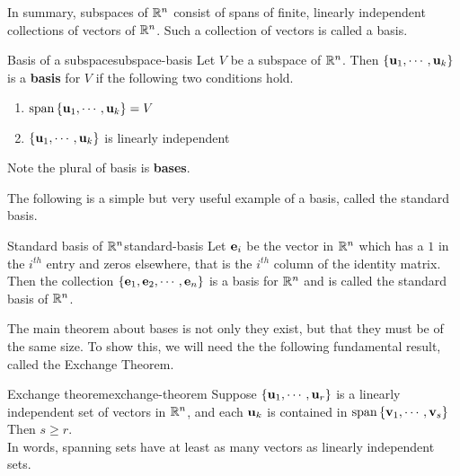 In summary, subspaces of $\mathbb{R}^{n}$ consist of spans of finite, linearly
independent collections of vectors of $\mathbb{R}^{n}$.  Such a collection of
vectors is called a basis.

\begin{definition}{Basis of a subspace}{subspace-basis}
  Let $V$ be a subspace of $\mathbb{R}^{n}$. Then
  $\left\{ \mbox{\bf u}_{1},\cdots ,\mbox{\bf u}_{k}\right\} $ is a \textbf{basis} for
  $V$ if the following two conditions
  hold.

  \begin{enumerate}
  \item $\sspan\set{\vect{u}_{1},\cdots ,\vect{u}_{k}} =V$
  \item $\left\{\mbox{\bf u}_{1},\cdots ,\mbox{\bf u}_{k}\right\} $ is linearly
    independent
  \end{enumerate}

  Note the plural of basis is \textbf{bases}. 
\end{definition}

The following is a simple but very useful example of a basis, called
the standard basis.

\begin{definition}{Standard basis of $\mathbb{R}^n$}{standard-basis}
  Let $\mbox{\bf e}_i$ be the vector in $\mathbb{R}^n$ which has a $1$ in the
  $i^{th}$ entry and zeros elsewhere, that is the $i^{th}$ column of
  the identity matrix. Then the collection
  $\left\{\mbox{\bf e}_1, \mbox{\bf e}_2, \cdots, \mbox{\bf e}_n \right\}$ is a basis for
  $\mathbb{R}^n$ and is called the standard basis of
  $\mathbb{R}^n$.
\end{definition}

The main theorem about bases is not only they exist, but that they
must be of the same size. To show this, we will need the the following
fundamental result, called the Exchange Theorem.

\begin{theorem}{Exchange theorem}{exchange-theorem}
  Suppose $\left\{\mbox{\bf u}_{1},\cdots ,\mbox{\bf u}_{r}\right\} $ is a linearly
  independent set of vectors in $\mathbb{R}^n$, and each $\mbox{\bf u}_{k}$ is
  contained in $\sspan\set{\vect{v}_{1},\cdots
    ,\vect{v}_{s}}$ Then $s\geq r$. \\
  In words, spanning sets have at least as
  many vectors as linearly independent sets.
\end{theorem}


